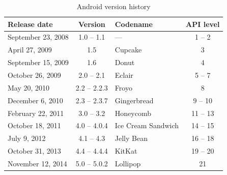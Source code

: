 \begin {table}[h!]
    \begin{tabular}{|l|c|l|c|}
    \hline
    {\bf Release date}  & {\bf Version} & {\bf Codename}        & {\bf API level}   \\
    \hline \hline
    September 23, 2008  & 1.0 -- 1.1    & ---                   & 1 -- 2            \\
    \hline
    April 27, 2009      & 1.5           & Cupcake               & 3                 \\
    \hline
    September 15, 2009  & 1.6           & Donut                 & 4                 \\
    \hline
    October 26, 2009    & 2.0 -- 2.1    & Eclair                & 5 -- 7            \\
    \hline
    May 20, 2010        & 2.2 -- 2.2.3  & Froyo                 & 8                 \\
    \hline
    December 6, 2010    & 2.3 -- 2.3.7  & Gingerbread           & 9 -- 10           \\
    \hline
    February 22, 2011   & 3.0 -- 3.2    & Honeycomb             & 11 -- 13          \\
    \hline
    October 18, 2011    & 4.0 -- 4.0.4  & Ice Cream Sandwich    & 14 -- 15          \\
    \hline
    July 9, 2012        & 4.1 -- 4.3    & Jelly Bean            & 16 -- 18          \\
    \hline
    October 31, 2013    & 4.4 -- 4.4.4  & KitKat                & 19 -- 20          \\
    \hline
    November 12, 2014   & 5.0 -- 5.0.2  & Lollipop              & 21                \\
    \hline
    \end{tabular}
    \centering
    \caption{Android version history}
    \label{androidHistory}
\end{table}

